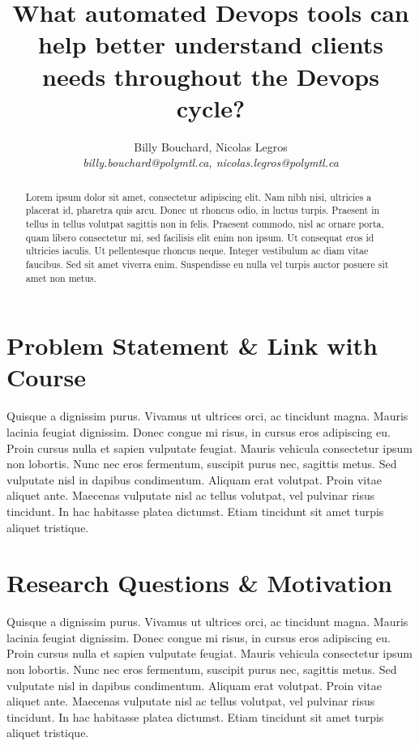 \documentclass[10pt, conference]{IEEEtran}
\title{What automated Devops tools can help better understand clients needs 
  throughout the Devops cycle?}
\author{Billy Bouchard, Nicolas Legros    \\
    \emph{billy.bouchard@polymtl.ca, nicolas.legros@polymtl.ca}}
\begin{document}
\maketitle

\begin{abstract}
Lorem ipsum dolor sit amet, consectetur adipiscing elit. Nam nibh nisi, ultricies a placerat id, pharetra quis arcu. Donec ut rhoncus odio, in luctus turpis. Praesent in tellus in tellus volutpat sagittis non in felis. Praesent commodo, nisl ac ornare porta, quam libero consectetur mi, sed facilisis elit enim non ipsum. Ut consequat eros id ultricies iaculis. Ut pellentesque rhoncus neque. Integer vestibulum ac diam vitae faucibus. Sed sit amet viverra enim. Suspendisse eu nulla vel turpis auctor posuere sit amet non metus.
\end{abstract}

\section{Problem Statement \& Link with Course}
\label{sec:statement}

Quisque a dignissim purus. Vivamus ut ultrices orci, ac tincidunt magna. Mauris lacinia feugiat dignissim. Donec congue mi risus, in cursus eros adipiscing eu. Proin cursus nulla et sapien vulputate feugiat. Mauris vehicula consectetur ipsum non lobortis. Nunc nec eros fermentum, suscipit purus nec, sagittis metus. Sed vulputate nisl in dapibus condimentum. Aliquam erat volutpat. Proin vitae aliquet ante. Maecenas vulputate nisl ac tellus volutpat, vel pulvinar risus tincidunt. In hac habitasse platea dictumst. Etiam tincidunt sit amet turpis aliquet tristique.

\section{Research Questions \& Motivation}
\label{sec:research-idea}

Quisque a dignissim purus. Vivamus ut ultrices orci, ac tincidunt magna. Mauris lacinia feugiat dignissim. Donec congue mi risus, in cursus eros adipiscing eu. Proin cursus nulla et sapien vulputate feugiat. Mauris vehicula consectetur ipsum non lobortis. Nunc nec eros fermentum, suscipit purus nec, sagittis metus. Sed vulputate nisl in dapibus condimentum. Aliquam erat volutpat. Proin vitae aliquet ante. Maecenas vulputate nisl ac tellus volutpat, vel pulvinar risus tincidunt. In hac habitasse platea dictumst. Etiam tincidunt sit amet turpis aliquet tristique.
\end{document}

